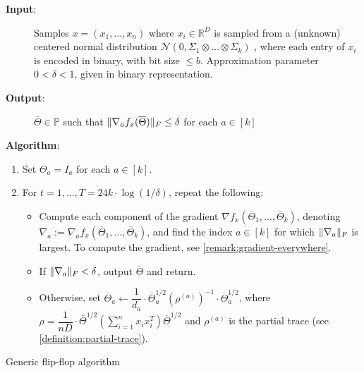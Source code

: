 \documentclass[aos]{imsart}
\theoremstyle{definition}
\numberwithin{equation}{section}
\DeclarePairedDelimiter{\norm}{\lVert}{\rVert}
\newcommand{\R}{{\mathbb{R}}}
\newcommand{\otheta}{\overline{\Theta}}
\newcommand{\ot}{\otimes}
\newcommand{\eps}{\varepsilon}
\newcommand{\cN}{\mathcal{N}}
\newcommand{\SPD}{\mathbb{P}}
\newcommand{\samp}{x}
\def\dmax{d_{\max}}
\begin{document}
\begin{Algorithm}
\begin{description}
\item[\hspace{.2cm}\textbf{Input}:] Samples $\samp = (\samp_1, \ldots, \samp_n)$ where $\samp_i \in \R^D$ is sampled from a (unknown) centered normal distribution $\cN(0, \Sigma_1\ot \dots \ot \Sigma_k)$ , where each entry of $\samp_i$ is encoded in binary, with bit size $\le b$. Approximation parameter $0 < \delta < 1$, given in binary representation. \\%

\item[\hspace{.2cm}\textbf{Output}:] $\otheta \in \SPD$ such that $\norm{\nabla_a f_x(\otheta)}_F \leq \delta$ for each $a \in [k]$ \\%

\item[\hspace{.2cm}\textbf{Algorithm}:]
\end{description}
\begin{enumerate}
\item\label{it:flip-flop step 1} Set $\otheta_a = I_a$ for each $a \in [k]$.

\vspace{5pt}

\item\label{it:flip-flop step 2} For $t=1,\dots,T = 24 k \cdot \log(1/\delta)$, repeat the following:

\vspace{5pt}

\begin{itemize}
\item Compute each component of the gradient $\nabla f_{\samp}(\otheta_1, \ldots, \otheta_k)$, denoting $\nabla_a := \nabla_a f_{\samp}(\otheta_1, \ldots, \otheta_k)$, and find the index $a \in [k]$ for which $\norm{\nabla_a}_F$ is largest. To compute the gradient, see \cref{remark:gradient-everywhere}.

\vspace{5pt}

\item
If $\norm{\nabla_a}_F < \delta$, output $\otheta$ and return.

\vspace{5pt}

\item Otherwise, set $\otheta_a \leftarrow  \dfrac{1}{d_a} \cdot \otheta_a^{1/2} (\rho^{(a)})^{-1} \cdot \otheta_a^{1/2}$, where $\rho = \dfrac{1}{nD} \cdot  \otheta^{1/2} \left( \sum_{i=1}^n x_ix_i^T \right) \otheta^{1/2}$ and $\rho^{(a)}$ is the partial trace (see \cref{definition:partial-trace}).
\end{itemize}
\end{enumerate}
\caption{Generic flip-flop algorithm}\label{alg:flip-flop}
\end{Algorithm}
\end{document}
